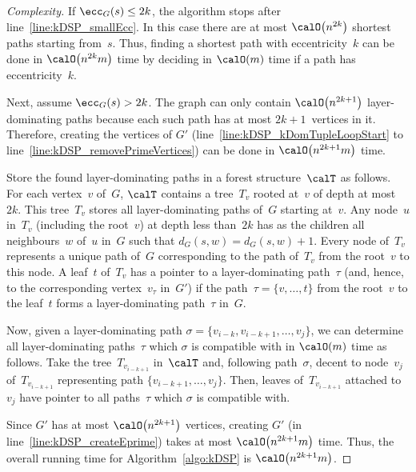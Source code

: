 \begin{proof}
    [Complexity]
If $\ecc_G(s) \leq 2k$, the algorithm stops after line~\ref{line:kDSP_smallEcc}.
In this case there are at most $\calO \big( n^{2k} \big)$ shortest paths starting from~$s$.
Thus, finding a shortest path with eccentricity~$k$ can be done in $\calO \big( n^{2k} m \big)$ time by deciding in $\calO(m)$ time if a path has eccentricity~$k$.

Next, assume $\ecc_G(s) > 2k$.
The graph can only contain $\calO \big( n^{2k+1} \big)$ layer-dominating paths because each such path has at most $2k + 1$~vertices in it.
Therefore, creating the vertices of $G'$ (line~\ref{line:kDSP_kDomTupleLoopStart} to line~\ref{line:kDSP_removePrimeVertices}) can be done in $\calO \big( n^{2k+1} m \big)$ time.

Store the found layer-dominating paths in a forest structure~$\calT$ as follows.
For each vertex~$v$ of~$G$, $\calT$ contains a tree~$T_v$ rooted at~$v$ of depth at most~$2k$.
This tree~$T_v$ stores all layer-dominating paths of~$G$ starting at~$v$.
Any node~$u$ in~$T_v$ (including the root~$v$) at depth less than~$2k$ has as the children all neighbours~$w$ of~$u$ in~$G$ such that $d_G(s, w) = d_G(s, w) + 1$.
Every node of~$T_v$ represents a unique path of~$G$ corresponding to the path of~$T_v$ from the root~$v$ to this node.
A leaf~$t$ of~$T_v$ has a pointer to a layer-dominating path~$\tau$ (and, hence, to the corresponding vertex~$v_\tau$ in~$G'$) if the path~$\tau = \{ v, \ldots, t \}$ from the root~$v$ to the leaf~$t$ forms a layer-dominating path~$\tau$ in~$G$.

Now, given a layer-dominating path $\sigma = \{ v_{i-k}, v_{i-k+1}, \ldots, v_j \}$, we can determine all layer-dominating paths~$\tau$ which $\sigma$ is compatible with in $\calO(m)$ time as follows.
Take the tree~$T_{v_{i-k+1}}$ in~$\calT$ and, following path~$\sigma$, decent to node~$v_j$ of~$T_{v_{i-k+1}}$ representing path $\{ v_{i-k+1}, \ldots, v_j \}$.
Then, leaves of~$T_{v_{i-k+1}}$ attached to~$v_j$ have pointer to all paths~$\tau$ which $\sigma$ is compatible with.

Since $G'$ has at most $\calO \big( n^{2k+1} \big)$ vertices, creating $G'$ (in line~\ref{line:kDSP_createEprime}) takes at most $\calO \big( n^{2k+1} m \big)$ time.
Thus, the overall running time for Algorithm~\ref{algo:kDSP} is $\calO \big( n^{2k+1} m \big)$.
\end{proof}

